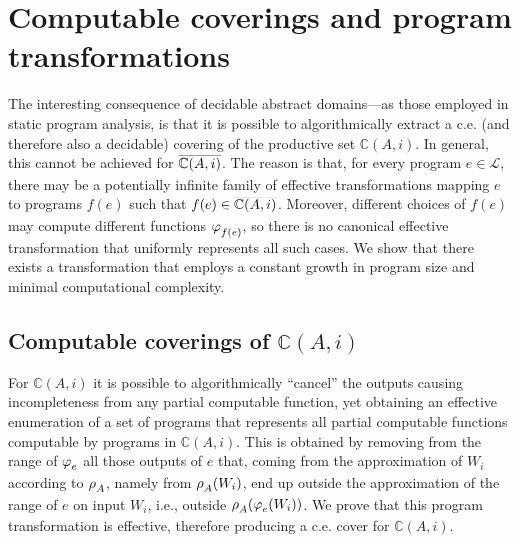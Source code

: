 \documentclass[runningheads]{llncs}
\def\ok#1{\mbox{\raisebox{0ex}[1ex][1ex]{$#1$}}}
\def\re{c.e.}
\newcommand{\myqed}{\textsc{Q.E.D.}}
\def\bbbc{{\mathbb{C}}}
\newcommand{\ccL}{\mathscr{L}}
\newcommand{\pfunction}[3]{\ok{\varphi^{#2\, #3}_{#1}}}
\newcommand{\auco}[2]{\ok{\rho^{#1}_{#2}}}
\newcommand{\compl}[1]{\ok{\overline{#1}}}
\def\ok#1{\mbox{\raisebox{0ex}[1ex][1ex]{$#1$}}}
\def\cAA{\ensuremath{A}}
\begin{document}



\section{Computable coverings and program transformations}

The interesting consequence of decidable abstract domains---as those employed in static program analysis, is that it is possible to algorithmically extract a {\re} (and therefore also a decidable) covering of the productive set $\bbbc(\cAA,i)$. In general, this cannot be achieved for \(\compl{\bbbc(\cAA,i)}\). The reason is that, for every program \(e \in \ccL\), there may be a potentially infinite family of effective transformations mapping $e$ to programs $f(e)$ such that \(f(e) \in \compl{\bbbc(\cAA,i)}\). Moreover, different choices of $f(e)$ may compute different functions $\pfunction{f(e)}{}{}$, so there is no canonical effective transformation that uniformly represents all such cases. We show that there exists a transformation that employs a constant growth in program size and minimal computational complexity.

\subsection{Computable coverings of $\bbbc(\cAA,i)$}
For $\bbbc(\cAA,i)$ it is possible to algorithmically ``cancel'' the outputs causing incompleteness from any partial computable function, yet obtaining an effective enumeration of a set of programs that represents all partial computable functions computable by programs in $\bbbc(\cAA,i)$.  
This is obtained by removing from the range of $\pfunction{e}{}{}$ all those outputs of $e$ that, coming from the approximation of $W_i$ according to $\auco{}{\cAA}$, namely from $\auco{}{\cAA}(W_i)$, end up outside the approximation of the range of $e$ on input $W_i$, i.e., 
outside $\auco{}{\cAA}(\pfunction{e}{}{}(W_i))$.
We prove that this program transformation is effective, therefore producing a {\re} cover for $\bbbc(\cAA,i)$.
\end{document}
